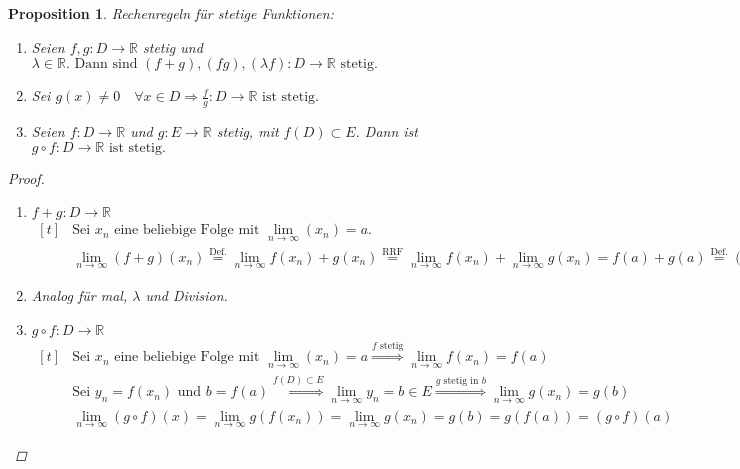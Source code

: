\documentclass[a4paper,titlepage,oneside]{article}
\def\R{\ensuremath{\mathbb{R}} }
\def\sp{\hspace{0,1cm}}
\renewcommand{\liminf}[2][n]{\ensuremath{\lim\limits_{#1 \rightarrow \infty}{#2}}}
\theoremstyle{thmstyle}
\newtheorem{prop}[satz]{Proposition}
\theoremstyle{subthmstyle}
\begin{document}
\begin{prop}
Rechenregeln für stetige Funktionen:
\begin{enumerate}
\item Seien  $f, g : D \to \R$ stetig und $\lambda \in \R. \text{ Dann sind } (f+g),(fg),(\lambda f) : D \to \R \text{ stetig.}$
\item Sei $\displaystyle g(x) \ne 0 \quad \forall x \in D \Rightarrow \frac{f}{g}: D \to \R \text{ ist stetig.}$
\item Seien \(f: D \to \R\) und \(g:E \to \R\) stetig, mit \(f(D) \subset E\). Dann ist $ g \circ f : D \to \R \text{ ist stetig.}$
\end{enumerate}

\begin{proof}\sp
\begin{enumerate}
\item \(f+g : D \to \R\) \\
\begin{math}\displaystyle \begin{aligned}[t]
&\text{Sei } x_n \text{ eine beliebige Folge mit } \liminf{(x_n)} = a. \\
&\liminf{(f+g)(x_n)} \overset{\text{Def.}}{=} \liminf{f(x_n) + g(x_n)} \overset{\text{RRF}}{=} \liminf{f(x_n)} + \liminf{g(x_n)} = f(a) + g(a) \overset{\text{Def.}}{=} (f+g)(a)
\end{aligned}\end{math} 

\item Analog für mal, \(\lambda\) und Division. %

\item \(g \circ f : D \to \R\)\\
\begin{math}\displaystyle \begin{aligned}[t]
&\text{Sei } x_n \text{ eine beliebige Folge mit } \liminf{(x_n)} = a \overset{f\text{ stetig}}{\Rightarrow} \liminf{f(x_n)} = f(a) \\
&\text{Sei } y_n = f(x_n) \text{ und } b = f(a) \overset{f(D) \subset E}{\Rightarrow}  \liminf{y_n} = b \in E \overset{g \text{ stetig in }b}{\Rightarrow} \liminf{g(x_n)} = g(b) \\
&\liminf{(g \circ f)(x)} = \liminf{g(f(x_n))} = \liminf{g(x_n)} = g(b) = g(f(a)) = (g \circ f)(a)
\end{aligned}\end{math} 
\end{enumerate}
\end{proof}
\end{prop}
\end{document}
